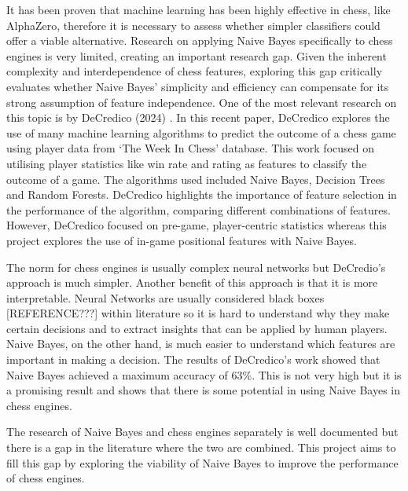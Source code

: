 It has been proven that machine learning has been highly effective in chess, like AlphaZero, therefore it is necessary to assess whether simpler classifiers could offer a viable alternative. Research on applying Naive Bayes specifically to chess engines is very limited, creating an important research gap. Given the inherent complexity and interdependence of chess features, exploring this gap critically evaluates whether Naive Bayes' simplicity and efficiency can compensate for its strong assumption of feature independence. One of the most relevant research on this topic is by DeCredico (2024) \cite{decredicoUsingMachineLearning}. In this recent paper, DeCredico explores the use of many machine learning algorithms to predict the outcome of a chess game using player data from `The Week In Chess' database. This work focused on utilising player statistics like win rate and rating as features to classify the outcome of a game. The algorithms used included Naive Bayes, Decision Trees and Random Forests. DeCredico highlights the importance of feature selection in the performance of the algorithm, comparing different combinations of features. However, DeCredico focused on pre-game, player-centric statistics whereas this project explores the use of in-game positional features with Naive Bayes. 

The norm for chess engines is usually complex neural networks but DeCredio's approach is much simpler. Another benefit of this approach is that it is more interpretable. Neural Networks are usually considered black boxes [REFERENCE???] within literature so it is hard to understand why they make certain decisions and to extract insights that can be applied by human players. Naive Bayes, on the other hand, is much easier to understand which features are important in making a decision. The results of DeCredico's work showed that Naive Bayes achieved a maximum accuracy of 63\%. This is not very high but it is a promising result and shows that there is some potential in using Naive Bayes in chess engines. 

The research of Naive Bayes and chess engines separately is well documented but there is a gap in the literature where the two are combined. This project aims to fill this gap by exploring the viability of Naive Bayes to improve the performance of chess engines.
